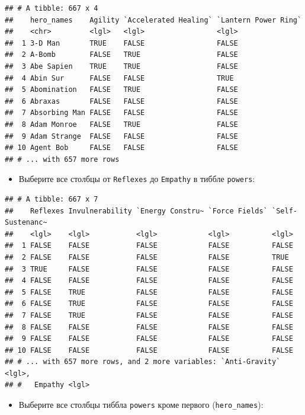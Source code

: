 \documentclass[]{book}
\providecommand{\tightlist}{%
  \setlength{\itemsep}{0pt}\setlength{\parskip}{0pt}}
\begin{document}
\begin{verbatim}
## # A tibble: 667 x 4
##    hero_names    Agility `Accelerated Healing` `Lantern Power Ring`
##    <chr>         <lgl>   <lgl>                 <lgl>               
##  1 3-D Man       TRUE    FALSE                 FALSE               
##  2 A-Bomb        FALSE   TRUE                  FALSE               
##  3 Abe Sapien    TRUE    TRUE                  FALSE               
##  4 Abin Sur      FALSE   FALSE                 TRUE                
##  5 Abomination   FALSE   TRUE                  FALSE               
##  6 Abraxas       FALSE   FALSE                 FALSE               
##  7 Absorbing Man FALSE   FALSE                 FALSE               
##  8 Adam Monroe   FALSE   TRUE                  FALSE               
##  9 Adam Strange  FALSE   FALSE                 FALSE               
## 10 Agent Bob     FALSE   FALSE                 FALSE               
## # ... with 657 more rows
\end{verbatim}

\begin{itemize}
\tightlist
\item
  Выберите все столбцы от \texttt{Reflexes} до \texttt{Empathy} в тиббле
  \texttt{powers}:
\end{itemize}

\begin{verbatim}
## # A tibble: 667 x 7
##    Reflexes Invulnerability `Energy Constru~ `Force Fields` `Self-Sustenanc~
##    <lgl>    <lgl>           <lgl>            <lgl>          <lgl>           
##  1 FALSE    FALSE           FALSE            FALSE          FALSE           
##  2 FALSE    FALSE           FALSE            FALSE          TRUE            
##  3 TRUE     FALSE           FALSE            FALSE          FALSE           
##  4 FALSE    FALSE           FALSE            FALSE          FALSE           
##  5 FALSE    TRUE            FALSE            FALSE          FALSE           
##  6 FALSE    TRUE            FALSE            FALSE          FALSE           
##  7 FALSE    TRUE            FALSE            FALSE          FALSE           
##  8 FALSE    FALSE           FALSE            FALSE          FALSE           
##  9 FALSE    FALSE           FALSE            FALSE          FALSE           
## 10 FALSE    FALSE           FALSE            FALSE          FALSE           
## # ... with 657 more rows, and 2 more variables: `Anti-Gravity` <lgl>,
## #   Empathy <lgl>
\end{verbatim}

\begin{itemize}
\tightlist
\item
  Выберите все столбцы тиббла \texttt{powers} кроме первого
  (\texttt{hero\_names}):
\end{itemize}
\end{document}
